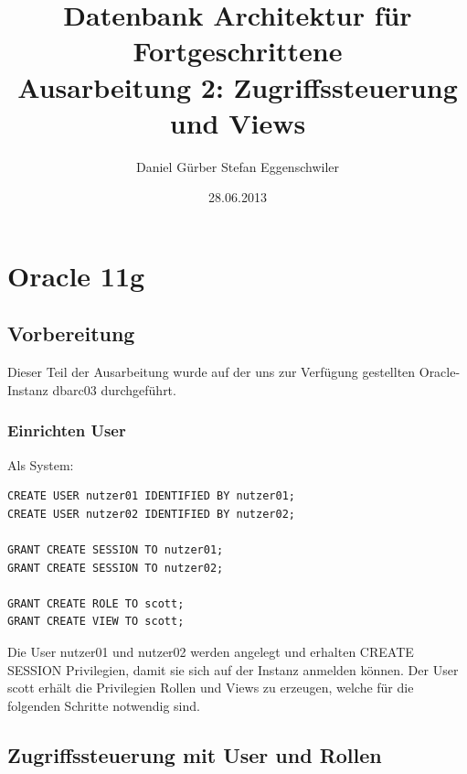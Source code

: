 \documentclass[10pt]{scrreprt}
\title{
\vspace{4cm}
\huge{Datenbank Architektur für Fortgeschrittene}\\
\vspace{0.2cm}
\Large{Ausarbeitung 2: Zugriffssteuerung und Views}\\
}
\author{Daniel Gürber \cr Stefan Eggenschwiler}
\date{28.06.2013}
\begin{document}
\maketitle
\thispagestyle{fancy}

\newpage

\tableofcontents	


\newpage
\setcounter{page}{1}

\chapter{Oracle 11g}
\section{Vorbereitung}
Dieser Teil der Ausarbeitung wurde auf der uns zur Verfügung gestellten Oracle-Instanz dbarc03 durchgeführt.
\subsection{Einrichten User}
Als System:
\begin{lstlisting}[style=sql]
CREATE USER nutzer01 IDENTIFIED BY nutzer01;
CREATE USER nutzer02 IDENTIFIED BY nutzer02;

GRANT CREATE SESSION TO nutzer01;
GRANT CREATE SESSION TO nutzer02;

GRANT CREATE ROLE TO scott;
GRANT CREATE VIEW TO scott;
\end{lstlisting}
Die User nutzer01 und nutzer02 werden angelegt und erhalten CREATE SESSION Privilegien, damit sie sich auf der Instanz anmelden können. Der User scott erhält die Privilegien Rollen und Views zu erzeugen, welche für die folgenden Schritte notwendig sind.

\section{Zugriffssteuerung mit User und Rollen}
\end{document}
